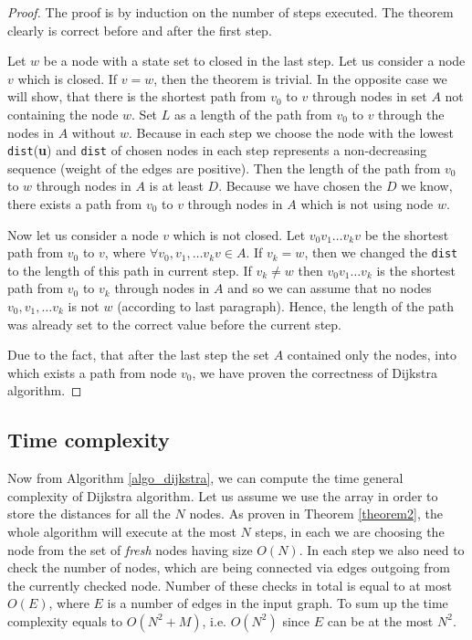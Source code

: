 \documentclass[thesis=M,english]{FITthesis}[2012/10/20]
\begin{document}
\begin{proof}
The proof is by induction on the number of steps executed. The theorem clearly is correct before and after the first step. 

Let $w$ be a node with a state set to closed in the last step. Let us consider a node $v$ which is closed.
If $v=w$, then the theorem is trivial. In the opposite case we will show, that there is the shortest path from $v_0$ to $v$ through nodes in set $A$ not containing the node $w$. Set $L$ as a length of the path from $v_0$ to $v$ through the nodes in $A$ without $w$. Because in each step we choose the node with the lowest \texttt{dist}(\textbf{u}) and \texttt{dist} of chosen nodes in each step represents a non-decreasing sequence (weight of the edges are positive). Then the length of the path from $v_0$ to $w$ through nodes in $A$ is at least $D$. Because we have chosen the $D$ we know, there exists a path from $v_0$ to $v$ through nodes in $A$ which is not using node $w$.

Now let us consider a node $v$ which is not closed. Let $v_0 v_1 \dots v_k v$ be the shortest path from $v_0$ to $v$, where $\forall v_0, v_1, \dots v_k v \in A$. 
If $v_k = w$, then we changed the \texttt{dist} to the length of this path in current step. If $v_k \neq w$ then $v_0 v_1 \dots v_k$ is the shortest path from $v_0$ to $v_k$ through nodes in $A$ and so we can assume that no nodes $v_0, v_1, \dots v_k $ is not $w$ (according to last paragraph). Hence, the length of the path was already set to the correct value before the current step.

Due to the fact, that after the last step the set $A$ contained only the nodes, into which exists a path from node $v_0$, we have proven the correctness of Dijkstra algorithm.
\end{proof}

\subsection{Time complexity}
Now from Algorithm \ref{algo_dijkstra}, we can compute the time general complexity of Dijkstra algorithm. Let us assume we use the array in order to store the distances for all the $N$ nodes. As proven in Theorem \ref{theorem2}, the whole algorithm will execute at the most $N$ steps, in each we are choosing the node from the set of \textit{fresh} nodes having size $O(N)$. In each step we also need to check the number of nodes, which are being connected via edges outgoing from the currently checked node. Number of these checks in total is equal to at most $O(E)$, where $E$ is a number of edges in the input graph. To sum up the time complexity equals to $O(N^2 + M)$, i.e. $O(N^2)$ since $E$ can be at the most $N^2$.
\end{document}
